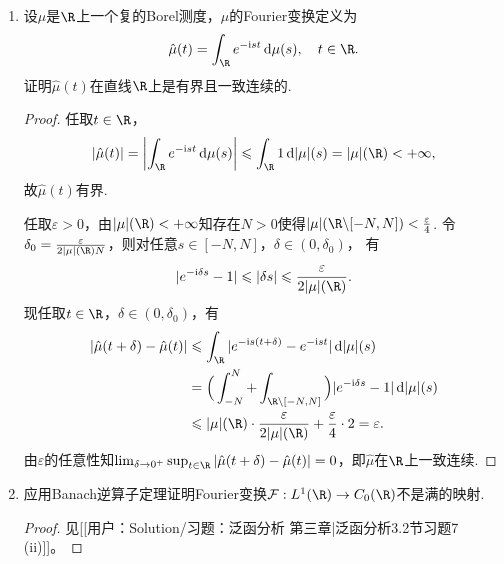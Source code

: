 \begin{enumerate}
\begin{proof}
        (iv)对任意$x\in\R$，$n\in\Z_+$，\[\hat{\varphi}_n(x)=\int_{\R}\varphi_n(t)e^{-{\rm i}xt}\,{\rm d}m(t)=\int_{\R}\varphi(t)e^{-{\rm i}x\frac{t}{n}}\,{\rm d}m(t).\]
        利用$\varphi\in C_c^\infty(\R)$与控制收敛定理可知$\lim_{n\to\infty}\hat{\varphi}_n(x)=1$.
    \end{proof}
    \item 设$\mu$是$\R$上一个复的Borel测度，$\mu$的Fourier变换定义为
    \[\hat{\mu}(t)=\int_{\R}e^{-\text{i}st}\,{\rm d}\mu(s),\quad t\in\R.\] 证明$\hat{\mu}(t)$在直线$\R$上是有界且一致连续的.
    \begin{proof}
        任取$t\in\R$，\[|\hat{\mu}(t)|=\left|\int_{\R}e^{-{\rm i}st}\,{\rm d}\mu(s)\right|\leqslant\int_{\R}1\,{\rm d}|\mu|(s)=|\mu|(\R)<+\infty,\]故$\hat{\mu}(t)$有界.

        任取$\varepsilon>0$，由$|\mu|(\R)<+\infty$知存在$N>0$使得$|\mu|(\R\backslash[-N,N])<\frac{\varepsilon}{4}$.
        令$\delta_0=\frac{\varepsilon}{2|\mu|(\R)N}$，则对任意$s\in[-N,N]$，$\delta\in(0,\delta_0)$，
        有\[|e^{-{\rm i}\delta s}-1|\leqslant|\delta s|\leqslant\dfrac{\varepsilon}{2|\mu|(\R)}.\]现任取$t\in\R$，$\delta\in(0,\delta_0)$，有
        \begin{align*}
            |\hat{\mu}(t+\delta)-\hat{\mu}(t)|&\leqslant\int_{\R}|e^{-{\rm i}s(t+\delta)}-e^{-{\rm i}st}|\,{\rm d}|\mu|(s)\\
            &=\Big(\int_{-N}^N+\int_{\R\backslash[-N,N]}\Big)|e^{-{\rm i}\delta s}-1|\,{\rm d}|\mu|(s)\\
            &\leqslant|\mu|(\R)\cdot\dfrac{\varepsilon}{2|\mu|(\R)}+\dfrac{\varepsilon}{4}\cdot2=\varepsilon.
        \end{align*}
        由$\varepsilon$的任意性知$\lim_{\delta\to0^+}\sup_{t\in\R}|\hat{\mu}(t+\delta)-\hat{\mu}(t)|=0$，即$\hat{\mu}$在$\R$上一致连续.
    \end{proof}
    \item 应用Banach逆算子定理证明Fourier变换$\F:L^1(\R)\to C_0(\R)$不是满的映射.
    \begin{proof}
        见[[用户：Solution/\qquad 习题：泛函分析 第三章|泛函分析3.2节习题7 (ii)]]。
    \end{proof}
\end{enumerate}

\setcounter{section}{2}
\renewcommand\thesection{4.\arabic{section}}

